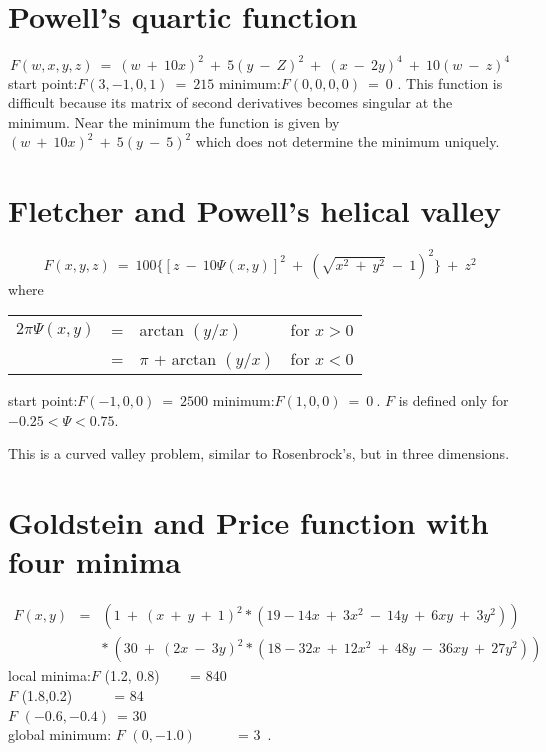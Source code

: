  
\section{Powell's quartic function}
 
 
     $$F(w,x,y,z)~=~(w~+~10x)^2~+~5(y~-~Z)^2~+~(x~-~2y)^4~+~10(w~-~z)^4$$
\noindent 
start point:{\phantom{xxxxxxxxxxxxxxxxxx}}$F(3,-1,0,1)~=~215$
\vskip2mm
\noindent
minimum:{\phantom{xxxxxxxxxxxxxxxxxxx}}$ F(0,0,0,0)~=~0$ .
 \vskip2mm
     This function is difficult because its matrix of second derivatives
becomes singular at the minimum.  Near the minimum the function is given
by $(w~+~10x)^2~+~5(y~-~5)^2$ which does not determine the minimum uniquely.\\ 
 
\section{Fletcher and Powell's helical valley}
 
 
$$F(x,y,z)~=~100\{[z~-~10\Psi(x,y)]^2~+~(\sqrt{x^2~+~y^2}~-~1)^2\}~+~z^2$$
\vskip2mm
\noindent
where 
\begin{tabular}{llll}             
$ 2\pi\Psi(x,y)$ &=& arctan $(y/x)$ &for $x > $0\\
                       &= &$\pi$ + arctan $(y/x)$& for $x < 0$
\end{tabular}
\vskip2mm
\noindent 
start point:{\phantom{xxxxxxxxxxxxxxxxxx}}$F(-1,0,0)~=~2500$
\vskip2mm
\noindent
minimum:{\phantom{xxxxxxxxxxxxxxxxxxx}}$F(1,0,0)~=~0~.$
\vskip2mm 
$F$ is defined only for $-0.25 < \Psi < 0.75$.
 
     This is a curved valley problem, similar to Rosenbrock's, but in
three dimensions.\\ 
 
 
\section{Goldstein and Price function with four minima}
 
 \begin{eqnarray}
     F(x,y)&=&(1~+~(x~+~y~+~1)^2 * (19-14x~+~3x^2~-~14y~+~6xy~+~3y^2))\nonumber\\
             &&*~(30~+~(2x~-~3y)^2 * (18-32x~+~12x^2~+~48y~-~36xy~+~27y^2))\nonumber
\end{eqnarray}
\vskip2mm
\noindent
local minima:{\phantom{xxxxxxxxxxxxxxxxxx}}$F$ (1.2, 0.8)~~~~\,= 840\\
{\phantom{xxxxxxxxxxxxxxxxxxxxxxxxxxxxx}}$F$ (1.8,0.2)~~~~~~= 84\\
{\phantom{xxxxxxxxxxxxxxxxxxxxxxxxxxxxx}}$F$ $(-0.6,-0.4)$~= 30\\
global minimum: {\phantom{xxxxxxxxxxxxxx}}$F$ $(0,-1.0)$~~~~~~= 3~.
 
